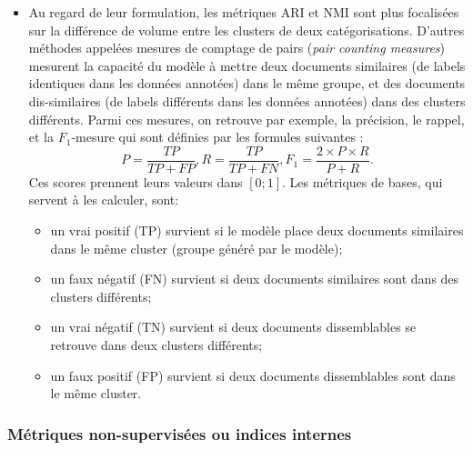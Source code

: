 \begin{itemize}
	\item Au regard de leur formulation, les métriques ARI et NMI sont plus focalisées sur la différence de volume entre les clusters de deux catégorisations. D'autres méthodes appelées  \og mesures de comptage de pairs \fg{} (\textit{pair counting measures}) mesurent la capacité du modèle à mettre deux documents similaires (de labels identiques dans les données annotées) dans le même groupe, et des documents dis-similaires (de labels différents dans les données annotées) dans des clusters différents. Parmi ces mesures, on retrouve par exemple, la précision, le rappel, et la $F_1$-mesure qui sont définies par les formules suivantes \citep{manning2009irbook-flatclustering}:
	{\footnotesize\[P = \frac{{TP}}{{TP} + {FP}}, R = \frac{{TP}}{{TP} + {FN}}, F_1 = \frac{2 \times P \times R}{P + R}.\]}
	Ces scores prennent leurs valeurs dans $[0;1]$. Les métriques de bases, qui servent à les calculer, sont:
	\begin{itemize}
		\item un vrai positif (TP) survient si le modèle place deux documents similaires dans le même cluster (groupe généré par le modèle);
		\item un faux négatif (FN) survient si deux documents similaires sont dans des clusters différents;
		\item un vrai négatif (TN) survient si deux documents dissemblables se retrouve dans deux clusters différents;
		\item un faux positif (FP) survient si deux documents dissemblables sont dans le même cluster.
	\end{itemize}
		
\end{itemize}



\subsubsection{Métriques non-supervisées ou indices internes}
\label{sec:similarite:biblio:unsupeval}

